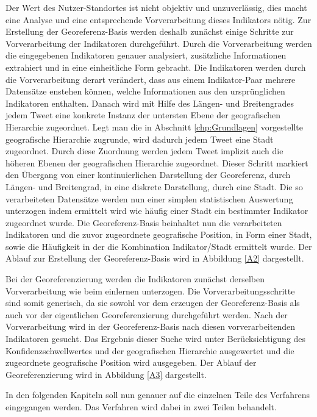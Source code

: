 	
	Der Wert des Nutzer-Standortes ist nicht objektiv und unzuverlässig, dies macht eine Analyse und eine entsprechende Vorverarbeitung dieses Indikators nötig.
	Zur Erstellung der Georeferenz-Basis werden deshalb zunächst einige Schritte zur Vorverarbeitung der Indikatoren durchgeführt.
	Durch die Vorverarbeitung werden die eingegebenen Indikatoren genauer analysiert, zusätzliche Informationen extrahiert und in eine einheitliche Form gebracht.
	Die Indikatoren werden durch die Vorverarbeitung derart verändert, dass aus einem Indikator-Paar mehrere Datensätze enstehen können, welche Informationen aus den ursprünglichen Indikatoren enthalten.
	Danach wird mit Hilfe des Längen- und Breitengrades jedem Tweet eine konkrete Instanz der untersten Ebene der geografischen Hierarchie zugeordnet.
	Legt man die in Abschnitt \ref{chp:Grundlagen} vorgestellte geografische Hierarchie zugrunde, wird dadurch jedem Tweet eine Stadt zugeordnet.
	Durch diese Zuordnung werden jedem Tweet implizit auch die höheren Ebenen der geografischen Hierarchie zugeordnet.   	 
	Dieser Schritt markiert den Übergang von einer kontinuierlichen Darstellung der Georeferenz, durch Längen- und Breitengrad, in eine diskrete Darstellung, durch eine Stadt. 
	Die so verarbeiteten Datensätze werden nun einer simplen statistischen Auswertung unterzogen indem ermittelt wird wie häufig einer Stadt ein bestimmter Indikator zugeordnet wurde.
	Die Georeferenz-Basis beinhaltet nun die verarbeiteten Indikatoren und die zuvor zugeordnete geografische Position, in Form einer Stadt, sowie die Häufigkeit in der die Kombination Indikator/Stadt ermittelt wurde.
	Der Ablauf zur Erstellung der Georeferenz-Basis wird in Abbildung \ref{A2} dargestellt.

	Bei der Georeferenzierung werden die Indikatoren zunächst derselben Vorverarbeitung wie beim einlernen unterzogen.
	Die Vorverarbeitungsschritte sind somit generisch, da sie sowohl vor dem erzeugen der Georeferenz-Basis als auch vor der eigentlichen Georeferenzierung durchgeführt werden.
	Nach der Vorverarbeitung wird in der Georeferenz-Basis nach diesen vorverarbeitenden Indikatoren gesucht.
	Das Ergebnis dieser Suche wird unter Berücksichtigung des Konfidenzschwellwertes und der geografischen Hierarchie ausgewertet und die zugeordnete geografische Position wird ausgegeben.  
	Der Ablauf der Georeferenzierung wird in Abbildung \ref{A3} dargestellt. 


	In den folgenden Kapiteln soll nun genauer auf die einzelnen Teile des Verfahrens eingegangen werden. 
	Das Verfahren wird dabei in zwei Teilen behandelt.

